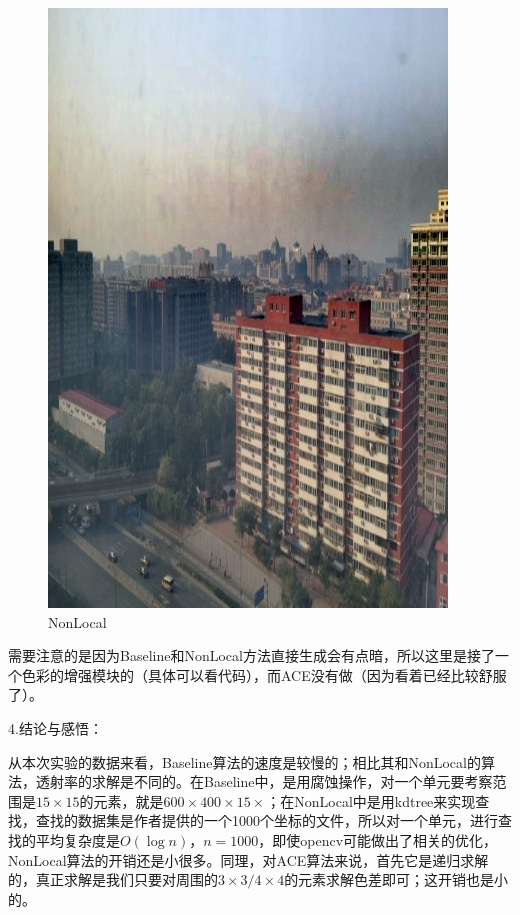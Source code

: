 \documentclass[12pt]{article}
\begin{document}
\begin{figure}[!h]
\begin{minipage}[t]{0.24\linewidth}
        \includegraphics[width=0.9\linewidth]{sample_pictures/after_RESIDE_NonLocal.jpg}
        \caption*{NonLocal}
    \end{minipage}
 \end{figure}\par
需要注意的是因为Baseline和NonLocal方法直接生成会有点暗，所以这里是接了一个色彩的增强模块的（具体可以看代码），而ACE没有做（因为看着已经比较舒服了）。
\newpage
\begin{Large}
\noindent 4.结论与感悟：\par
\end{Large}
从本次实验的数据来看，Baseline算法的速度是较慢的；相比其和NonLocal的算法，透射率的求解是不同的。在Baseline中，是用腐蚀操作，对一个单元要考察范围是$15\times 15$的元素，就是$600 \times 400 \times 15 \times$；在NonLocal中是用kdtree来实现查找，查找的数据集是作者提供的一个1000个坐标的文件，所以对一个单元，进行查找的平均复杂度是$O(\log n)$，$n=1000$，即使opencv可能做出了相关的优化，NonLocal算法的开销还是小很多。同理，对ACE算法来说，首先它是递归求解的，真正求解是我们只要对周围的$3\times 3/ 4\times 4$的元素求解色差即可；这开销也是小的。\par
\end{document}
